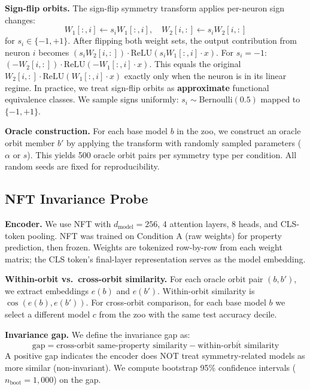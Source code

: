 \textbf{Sign-flip orbits.} The sign-flip symmetry transform applies per-neuron sign changes:
\begin{equation}
W_1[:, i] \leftarrow s_i W_1[:, i], \quad W_2[i, :] \leftarrow s_i W_2[i, :]
\end{equation}
for $s_i \in \{-1, +1\}$. After flipping both weight sets, the output contribution from neuron $i$ becomes $(s_i W_2[i,:])\cdot\mathrm{ReLU}(s_i W_1[:,i]\cdot x)$. For $s_i = -1$: $(-W_2[i,:])\cdot\mathrm{ReLU}(-W_1[:,i]\cdot x)$. This equals the original $W_2[i,:]\cdot\mathrm{ReLU}(W_1[:,i]\cdot x)$ exactly only when the neuron is in its linear regime. In practice, we treat sign-flip orbits as \textbf{approximate} functional equivalence classes. We sample signs uniformly: $s_i \sim \mathrm{Bernoulli}(0.5)$ mapped to $\{-1, +1\}$.

\textbf{Oracle construction.} For each base model $b$ in the zoo, we construct an oracle orbit member $b'$ by applying the transform with randomly sampled parameters ($\alpha$ or $s$). This yields 500 oracle orbit pairs per symmetry type per condition. All random seeds are fixed for reproducibility.

\subsection{NFT Invariance Probe}

\textbf{Encoder.} We use NFT \citep{Zhou2023NeuralFunctionalNetworks} with $d_{\mathrm{model}}=256$, 4 attention layers, 8 heads, and CLS-token pooling. NFT was trained on Condition A (raw weights) for property prediction, then frozen. Weights are tokenized row-by-row from each weight matrix; the CLS token's final-layer representation serves as the model embedding.

\textbf{Within-orbit vs.\ cross-orbit similarity.} For each oracle orbit pair $(b, b')$, we extract embeddings $e(b)$ and $e(b')$. Within-orbit similarity is $\cos(e(b), e(b'))$. For cross-orbit comparison, for each base model $b$ we select a different model $c$ from the zoo with the same test accuracy decile.

\textbf{Invariance gap.} We define the invariance gap as:
\begin{equation}
\text{gap} = \overline{\text{cross-orbit same-property similarity}} - \overline{\text{within-orbit similarity}}
\end{equation}
A positive gap indicates the encoder does NOT treat symmetry-related models as more similar (non-invariant). We compute bootstrap 95\% confidence intervals ($n_{\mathrm{boot}}=1{,}000$) on the gap.

